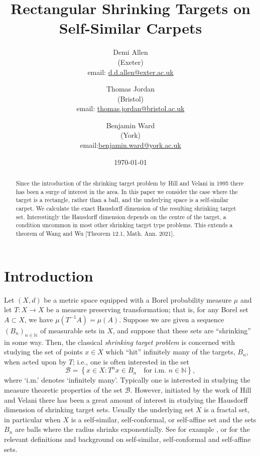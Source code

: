 \documentclass[12pt]{article}
\title{\sc Rectangular Shrinking Targets on Self-Similar Carpets}
\author{Demi Allen \\ (Exeter)\\ email: \href{mailto:d.d.allen@exeter.ac.uk}{d.d.allen@exter.ac.uk} \and Thomas Jordan \\ (Bristol)\\ email: \href{mailto:thomas.jordan@bristol.ac.uk}{thomas.jordan@bristol.ac.uk} \and Benjamin Ward \\ (York)\\email:\href{mailto:benjamin.ward@york.ac.uk}{benjamin.ward@york.ac.uk}}
\date{\today}
\theoremstyle{remark}
\numberwithin{equation}{section}
\renewcommand{\Bbb}[1]{\mathbb{#1}}
\newcommand{\N}{{\Bbb N}}         %
\newcommand{\cB}{{\mathcal B}}
\newcommand{\0}{\mathbf{0}}
\begin{document}
\frenchspacing
\maketitle
%
\begin{abstract}
Since the introduction of the shrinking target problem by Hill and Velani in 1995 there has been a surge of interest in the area. In this paper we consider the case where the target is a rectangle, rather than a ball, and the underlying space is a self-similar carpet. We calculate the exact Hausdorff dimension of the resulting shrinking target set. Interestingly the Hausdorff dimension depends on the centre of the target, a condition uncommon in most other shrinking target type problems. This extends a theorem of Wang and Wu [Theorem 12.1, Math. Ann. 2021].  

\end{abstract}
%


\maketitle



\section{Introduction}

Let $(X,d)$ be a metric space equipped with a Borel probability measure $\mu$ and let \mbox{$T: X \to X$} be a measure preserving transformation; that is, for any Borel set $A \subset X$, we have \linebreak \mbox{$\mu(T^{-1}A) = \mu(A)$}. 
Suppose we are given a sequence $(B_n)_{n \in \N}$ of measurable sets in $X$, and suppose that these sets are ``shrinking'' in some way. Then, the classical \emph{shrinking target problem} is concerned with studying the set of points $x \in X$ which ``hit'' infinitely many of the targets, $B_n$, when acted upon by $T$; i.e., one is often interested in the set
\[\cB = \left\{x \in X: T^n x \in B_n \quad \text{for i.m. } n \in \N\right\},\]
where `i.m.' denotes `infinitely many'. 
Typically one is interested in studying the measure theoretic properties of the set $\cB$. However, initiated by the work of Hill and Velani \cite{HillVelani95,HillVelani99} there has been a great amount of interest in studying the Hausdorff dimension of shrinking target sets. Usually the underlying set $X$ is a fractal set, in particular when $X$ is a self-similar, self-conformal, or self-affine set and the sets $B_n$ are balls where the radius shrinks exponentially. See for example \cite[Chapter 9]{Falconer}, \cite[Chapters 2 and 4]{BishopPeres} or \cite[\S7-9]{FraserAssouad} for the relevant definitions and background on self-similar, self-conformal and self-affine sets.
\end{document}
